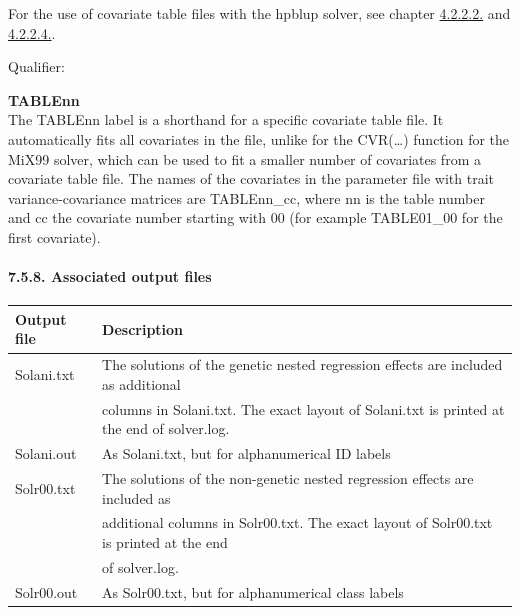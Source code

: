 For the use of covariate table files with the hpblup solver, see chapter
\hyperref[Obse11]{4.2.2.2.} and \hyperref[Obse13]{4.2.2.4.}.

Qualifier:

\textbf{TABLEnn}\\
The TABLEnn label is a shorthand for a specific covariate table file. It
automatically fits all covariates in the file, unlike for the
CVR(\ldots) function for the MiX99 solver, which can be used to fit a
smaller number of covariates from a covariate table file. The names of
the covariates in the parameter file with trait variance-covariance
matrices are TABLEnn\_cc, where nn is the table number and cc the
covariate number starting with 00 (for example TABLE01\_00 for the first
covariate).

\paragraph{7.5.8. Associated output files}\label{Stat28}

{\def\LTcaptype{none} %
\begin{longtable}[]{@{}
  >{\raggedright\arraybackslash}p{}
  >{\raggedright\arraybackslash}p{}@{}}
\toprule\noalign{}
\begin{minipage}[b]{\linewidth}\raggedright
Output file
\end{minipage} & \begin{minipage}[b]{\linewidth}\raggedright
Description
\end{minipage} \\
\midrule\noalign{}
\endhead
\bottomrule\noalign{}
\endlastfoot
Solani.txt & The solutions of the genetic nested regression effects are
included as additional \\
& columns in Solani.txt. The exact layout of Solani.txt is printed at
the end of solver.log. \\
Solani.out & As Solani.txt, but for alphanumerical ID labels \\
Solr00.txt & The solutions of the non-genetic nested regression effects
are included as \\
& additional columns in Solr00.txt. The exact layout of Solr00.txt is
printed at the end \\
& of solver.log. \\
Solr00.out & As Solr00.txt, but for alphanumerical class labels \\
\end{longtable}
}

